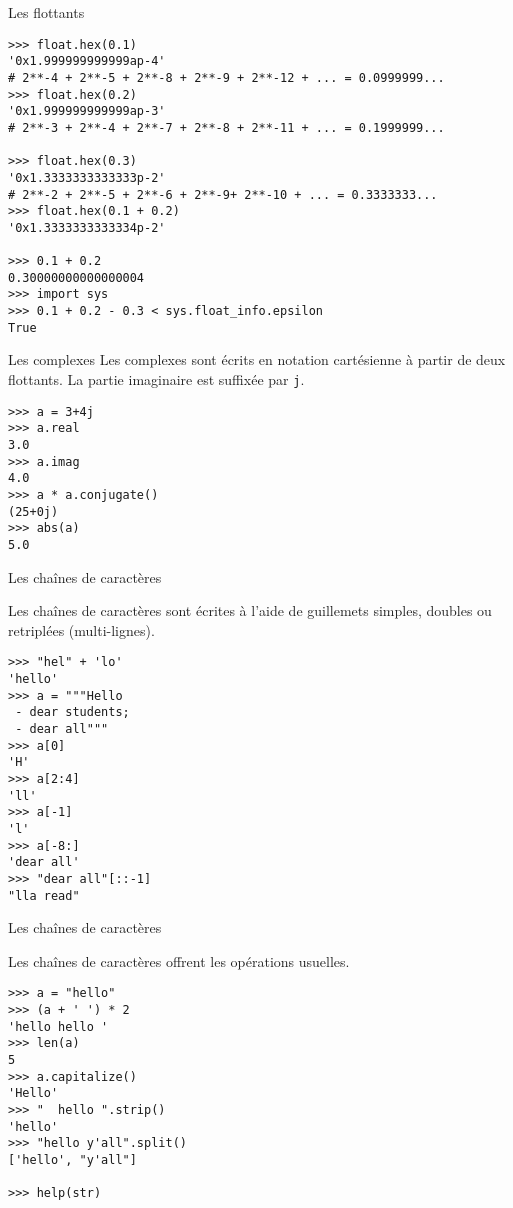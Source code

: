 \documentclass[dvipsnames]{beamer}
\begin{document}
\begin{frame}
    [fragile]{Les flottants}

    \begin{verbatim}
>>> float.hex(0.1)
'0x1.999999999999ap-4'
# 2**-4 + 2**-5 + 2**-8 + 2**-9 + 2**-12 + ... = 0.0999999...
>>> float.hex(0.2)
'0x1.999999999999ap-3'
# 2**-3 + 2**-4 + 2**-7 + 2**-8 + 2**-11 + ... = 0.1999999...

>>> float.hex(0.3)
'0x1.3333333333333p-2'
# 2**-2 + 2**-5 + 2**-6 + 2**-9+ 2**-10 + ... = 0.3333333...
>>> float.hex(0.1 + 0.2)
'0x1.3333333333334p-2'

>>> 0.1 + 0.2
0.30000000000000004
>>> import sys
>>> 0.1 + 0.2 - 0.3 < sys.float_info.epsilon
True
\end{verbatim}
\end{frame}

\begin{frame}
    [fragile]{Les complexes}
    Les complexes sont écrits en notation cartésienne à partir de deux
    flottants. La partie imaginaire est suffixée par \texttt{j}.
    \begin{verbatim}
>>> a = 3+4j
>>> a.real
3.0
>>> a.imag
4.0
>>> a * a.conjugate()
(25+0j)
>>> abs(a)
5.0
\end{verbatim}


\end{frame}

\begin{frame}
    [fragile]{Les chaînes de caractères}

    Les chaînes de caractères sont écrites à l'aide de guillemets simples,
    doubles ou retriplées (multi-lignes).

    \begin{verbatim}
>>> "hel" + 'lo'
'hello'
>>> a = """Hello
 - dear students;
 - dear all"""
>>> a[0]
'H'
>>> a[2:4]
'll'
>>> a[-1]
'l'
>>> a[-8:]
'dear all'
>>> "dear all"[::-1]
"lla read"
\end{verbatim}
\end{frame}

\begin{frame}
    [fragile]{Les chaînes de caractères}

    Les chaînes de caractères offrent les opérations usuelles.
    \begin{verbatim}
>>> a = "hello"
>>> (a + ' ') * 2
'hello hello '
>>> len(a)
5
>>> a.capitalize()
'Hello'
>>> "  hello ".strip()
'hello'
>>> "hello y'all".split()
['hello', "y'all"]

>>> help(str)
\end{verbatim}
\end{frame}
\end{document}
